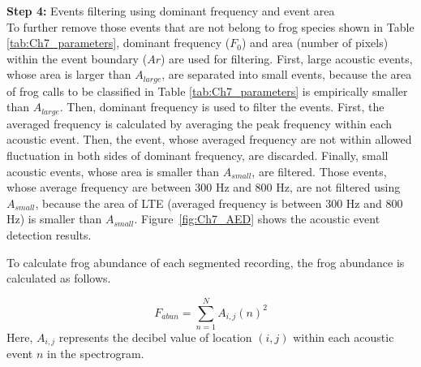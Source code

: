 \noindent \textbf{Step 4:} Events filtering using dominant frequency and event area \\
To further remove those events that are not belong to frog species shown in Table \ref{tab:Ch7_parameters}, dominant frequency ($F_{0}$) and area (number of pixels) within the event boundary ($Ar$) are used for filtering. First, large acoustic events, whose area is larger than $A_{large}$, are separated into small events, because the area of frog calls to be classified in Table \ref{tab:Ch7_parameters} is empirically smaller than $A_{large}$. Then, dominant frequency is used to filter the events. First, the averaged frequency is calculated by averaging the peak frequency within each acoustic event. Then, the event, whose averaged frequency are not within allowed fluctuation in both sides of dominant frequency, are  discarded. Finally, small acoustic events, whose area is smaller than $A_{small}$, are filtered. Those events, whose average frequency are between 300 Hz and 800 Hz, are not filtered using $A_{small}$, because the area of LTE (averaged frequency is between 300 Hz and 800 Hz) is smaller than $A_{small}$. Figure~\ref{fig:Ch7_AED} shows the acoustic event detection results.




To calculate frog abundance of each segmented recording, the frog abundance is calculated as follows.

\begin{equation}
F_{abun} = \sum_{n=1}^{N}A_{i,j}(n)^2
\end{equation}
Here, $A_{i,j}$ represents the decibel value of location $(i,j)$ within each acoustic event $n$ in the spectrogram.

